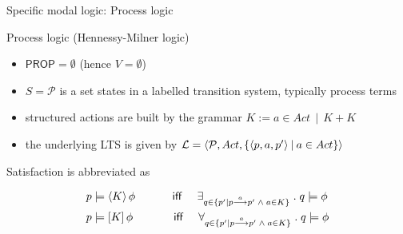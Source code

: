 \documentclass[aspectratio=169]{beamer}
\begin{document}
\begin{slide}{Specific modal logic: Process logic}\label{s:17}
\small
\begin{block}{Process logic (\alert{Hennessy-Milner logic})}
\begin{itemize}
\item $\mathsf{PROP} = \emptyset$ (hence $V = \emptyset$)
\item $S = \mathcal{P}$ is a set states in a labelled transition system, typically process terms
\item structured actions are built by the grammar \alert{$K := a\in Act~~|~~K+K$}
\item the underlying LTS is given by \alert{$\mathcal{L} = \langle \mathcal{P}, Act, \mathopen{\{} \langle p ,a, p' \rangle \mathbin{|} a \in Act \mathclose{\}} \rangle$}
\end{itemize}
\end{block}
Satisfaction is abbreviated as
\begin{alertblock}{}
  \vspace*{-4mm}
  \begin{align*}
p & \models \langle K \rangle\,{\phi} \text{ ~~~~~~~~ \textsf{iff} ~~~}
\exists_{q \in \mathopen{\{} p' \mathbin{|} p \stackrel{a}{\longrightarrow} p' \; \land\;  a \in K \mathclose{\}}}\; .\; q \models \phi \\
p & \models [K]\,{\phi} \text{~~~~~~~~~~ \textsf{iff} ~~~}
\forall_{q \in \mathopen{\{} p' \mathbin{|} p \stackrel{a}{\longrightarrow} p' \; \land\;  a \in K \mathclose{\}}}\; .\; q \models \phi 
\end{align*}
  \vspace*{-4mm}
\end{alertblock}
\end{slide}



\end{document}
